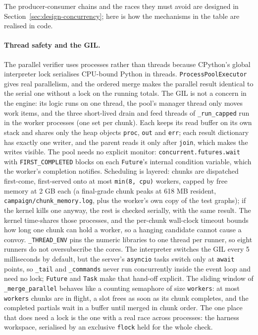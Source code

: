 The producer-consumer chains and the races they must avoid are designed in
Section~\ref{sec:design-concurrency}; here is how the mechanisms in the table are
realised in code.

\paragraph{Thread safety and the GIL.} The parallel verifier uses processes
rather than threads because CPython's global interpreter lock serialises
CPU-bound Python in threads. \texttt{ProcessPoolExecutor} gives real parallelism,
and the ordered merge makes the parallel result identical to the serial one
without a lock on the running totals. The GIL is not a concern in the engine: its
logic runs on one thread, the pool's manager thread only moves work items, and
the three short-lived drain and feed threads of \texttt{\_run\_capped} run in the
worker processes (one set per chunk). Each keeps its read buffer on its own stack
and shares only the heap objects \texttt{proc}, \texttt{out} and \texttt{err};
each result dictionary has exactly one writer, and the parent reads it only after
\texttt{join}, which makes the writes visible. The pool needs no explicit monitor:
\texttt{concurrent.futures.wait} with \texttt{FIRST\_COMPLETED} blocks on each
\texttt{Future}'s internal condition variable, which the worker's completion
notifies. Scheduling is layered: chunks are dispatched first-come, first-served
onto at most \texttt{min(8, cpu)} workers, capped by free memory at 2 GB each
(a final-grade chunk peaks at 618 MB resident, \texttt{campaign/chunk\_memory.log},
plus the worker's own copy of the test graphs); if the kernel kills one anyway, the
rest is checked serially, with the same result. The kernel time-shares those processes,
and the per-chunk wall-clock timeout bounds how long one chunk can hold a worker,
so a hanging candidate cannot cause a convoy. \texttt{\_THREAD\_ENV} pins the
numeric libraries to one thread per runner, so eight runners do not oversubscribe
the cores. The interpreter switches the GIL every 5 milliseconds by default, but
the server's \texttt{asyncio} tasks switch only at \texttt{await} points, so
\texttt{\_tail} and \texttt{\_commands} never run concurrently inside the event
loop and need no lock; \texttt{Future} and \texttt{Task} make that hand-off
explicit. The sliding window of \texttt{\_merge\_parallel} behaves like a counting
semaphore of size \texttt{workers}: at most \texttt{workers} chunks are in flight,
a slot frees as soon as its chunk completes, and the completed partials wait in a
buffer until merged in chunk order. The one place that does need a lock is the
one with a real race across processes: the harness workspace, serialised by an
exclusive \texttt{flock} held for the whole check.

